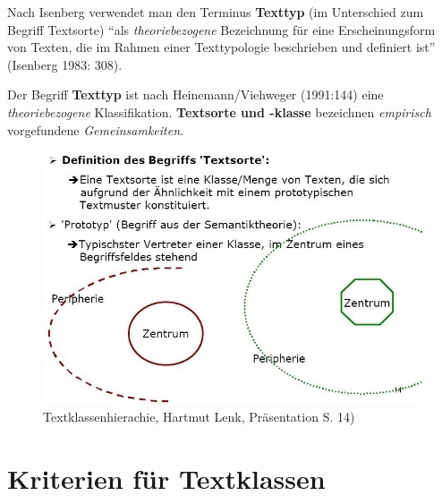 \documentclass[
  letterpaper,
]{scrbook}
\begin{document}
Nach Isenberg verwendet man den Terminus \textbf{Texttyp} (im
Unterschied zum Begriff Textsorte) ``als \emph{theoriebezogene}
Bezeichnung für eine Erscheinungsform von Texten, die im Rahmen einer
Texttypologie beschrieben und definiert ist'' (Isenberg 1983: 308).

Der Begriff \textbf{Texttyp} ist nach Heinemann/Viehweger (1991:144)
eine \emph{theoriebezogene} Klassifikation. \textbf{Textsorte und
-klasse} bezeichnen \emph{empirisch} vorgefundene
\emph{Gemeinsamkeiten}.

\begin{figure}

{\centering \includegraphics[width=1\textwidth,height=\textheight]{./pictures/textsortenprototypen.jpg}

}

\caption{Textklassenhierachie, Hartmut Lenk, Präsentation S. 14)}

\end{figure}

\hypertarget{kriterien-fuxfcr-textklassen}{%
\chapter{Kriterien für Textklassen}\label{kriterien-fuxfcr-textklassen}}
\end{document}
